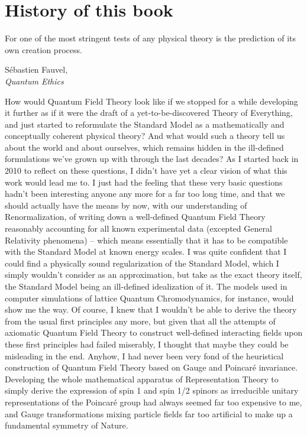 \chapter*{History of this book}

\renewcommand{\epigraphwidth}{8.3cm}
\epigraph{For one of the most stringent tests of any physical theory is the prediction of its own creation process.}{Sébastien Fauvel,\\\textit{Quantum Ethics}~\cite{Fauvel2013}}

How would Quantum Field Theory look like if we stopped for a while developing it further as if it were the draft of a yet-to-be-discovered Theory of Everything, and just started to reformulate the Standard Model as a mathematically and conceptually coherent physical theory? And what would such a theory tell us about the world and about ourselves, which remains hidden in the ill-defined formulations we've grown up with through the last decades? As I started back in 2010 to reflect on these questions, I didn't have yet a clear vision of what this work would lead me to. I just had the feeling that these very basic questions hadn't been interesting anyone any more for a far too long time, and that we should actually have the means by now, with our understanding of Renormalization, of writing down a well-defined Quantum Field Theory reasonably accounting for all known experimental data (excepted General Relativity phenomena) -- which means essentially that it has to be compatible with the Standard Model at known energy scales. I was quite confident that I could find a physically sound regularization of the Standard Model, which I simply wouldn't consider as an approximation, but take as the exact theory itself, the Standard Model being an ill-defined idealization of it. The models used in computer simulations of lattice Quantum Chromodynamics, for instance, would show me the way. Of course, I knew that I wouldn't be able to derive the theory from the usual first principles any more, but given that all the attempts of axiomatic Quantum Field Theory to construct well-defined interacting fields upon these first principles had failed miserably, I thought that maybe they could be misleading in the end. Anyhow, I had never been very fond of the heuristical construction of Quantum Field Theory based on Gauge and Poincaré invariance. Developing the whole mathematical apparatus of Representation Theory to simply derive the expression of spin 1 and spin 1/2 spinors as irreducible unitary representations of the Poincaré group had always seemed far too expensive to me, and Gauge transformations mixing particle fields far too artificial to make up a fundamental symmetry of Nature.

